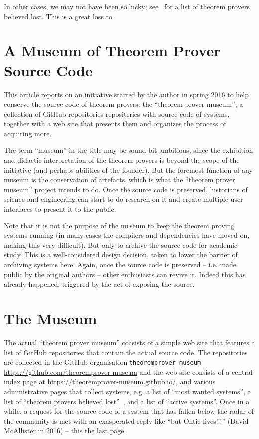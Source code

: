 \documentclass[smallcondensed]{svjour3}
\begin{document}
In other cases, we may not have been so lucky; see~\cite{tpmuseum:tpbl:on} for a list of
theorem provers believed lost. This is a great loss to

\section{A Museum of Theorem Prover Source Code}

This article reports on an initiative started by the author in spring 2016 to help
conserve the source code of theorem provers: the ``theorem prover museum'', a collection
of GitHub repositories repositories with source code of systems, together with a web site
that presents them and organizes the process of acquiring more.

The term ``museum'' in the title may be sound bit ambitious, since the exhibition and
didactic interpretation of the theorem provers is beyond the scope of the initiative (and
perhaps abilities of the founder). But the foremost function of any museum is the
conservation of artefacts, which is what the ``theorem prover museum'' project intends to
do. Once the source code is preserved, historians of science and engineering can start to
do research on it and create multiple user interfaces to present it to the public. 

Note that it is not the purpose of the museum to keep the theorem proving systems running
(in many cases the compilers and dependencies have moved on, making this very
difficult). But only to archive the source code for academic study.  This is a
well-considered design decision, taken to lower the barrier of archiving systems
here. Again, once the source code is preserved -- i.e. made public by the original authors
-- other enthusiasts can revive it. Indeed this has already happened, triggered by the act
of exposing the source.

\section{The Museum}

The actual ``theorem prover museum'' consists of a simple web site that features a list of
GitHub repositories that contain the actual source code. The repositories are collected in
the GitHub organisation \texttt{theoremprover-museum}
\url{https://github.com/theoremprover-museum} and the web site consists of a central index
page at \url{https://theoremprover-museum.github.io/}, and various administrative pages
that collect systems, e.g. a list of ``most wanted systems'', a list of ``theorem provers
believed lost''~\cite{tpmuseum:tpbl:on}, and a list of ``active systems''. Once in a
while, a request for the source code of a system that has fallen below the radar of the
community is met with an exasperated reply like ``but Ontic lives!!!'' (David McAllister
in 2016) -- this the last page.
\end{document}

